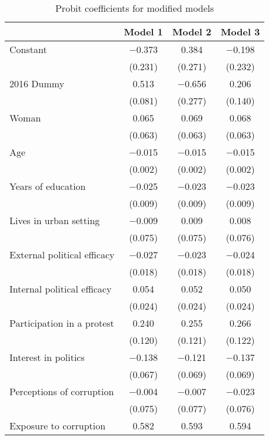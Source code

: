 \documentclass[12pt,a4]{article}
\begin{document}
\begin{table}[htbp]
\begin{center}
\caption{Probit coefficients for modified models}
\label{tab:complexmodprob}

\begin{tabular}[t]{lccc}
\toprule
  & Model 1 & Model 2 & Model 3\\
\midrule
Constant & \num{-0.373} & \num{0.384} & \num{-0.198}\\
 & (\num{0.231}) & (\num{0.271}) & (\num{0.232})\\
2016 Dummy & \num{0.513} & \num{-0.656} & \num{0.206}\\
 & (\num{0.081}) & (\num{0.277}) & (\num{0.140})\\
Woman & \num{0.065} & \num{0.069} & \num{0.068}\\
 & (\num{0.063}) & (\num{0.063}) & (\num{0.063})\\
Age & \num{-0.015} & \num{-0.015} & \num{-0.015}\\
 & (\num{0.002}) & (\num{0.002}) & (\num{0.002})\\
Years of education & \num{-0.025} & \num{-0.023} & \num{-0.023}\\
 & (\num{0.009}) & (\num{0.009}) & (\num{0.009})\\
Lives in urban setting & \num{-0.009} & \num{0.009} & \num{0.008}\\
 & (\num{0.075}) & (\num{0.075}) & (\num{0.076})\\
External political efficacy & \num{-0.027} & \num{-0.023} & \num{-0.024}\\
 & (\num{0.018}) & (\num{0.018}) & (\num{0.018})\\
Internal political efficacy & \num{0.054} & \num{0.052} & \num{0.050}\\
 & (\num{0.024}) & (\num{0.024}) & (\num{0.024})\\
Participation in a protest & \num{0.240} & \num{0.255} & \num{0.266}\\
 & (\num{0.120}) & (\num{0.121}) & (\num{0.122})\\
Interest in politics & \num{-0.138} & \num{-0.121} & \num{-0.137}\\
 & (\num{0.067}) & (\num{0.069}) & (\num{0.069})\\
Perceptions of corruption & \num{-0.004} & \num{-0.007} & \num{-0.023}\\
 & (\num{0.075}) & (\num{0.077}) & (\num{0.076})\\
Exposure to corruption & \num{0.582} & \num{0.593} & \num{0.594}\\

\end{tabular}
\end{center}
\end{table}
\end{document}
